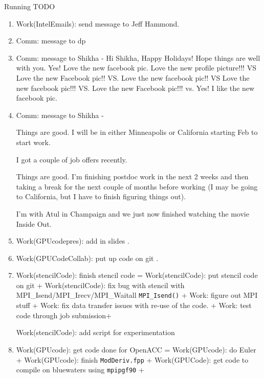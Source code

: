 \begin{frame}
\begin{columns}
\begin{column}{0.50\linewidth}
\begin{block}{Running TODO}
\begin{enumerate}
         
  
     \item \tiny Work(IntelEmails): send message to Jeff Hammond. 

     
   \item \tiny Comm: message to dp 
   \item \tiny Comm: message to Shikha  - Hi Shikha,
     Happy Holidays! Hope things are well with you. 
     Yes! Love the new facebook pic. 
     Love the new profile picture!!! VS  Love the new Facebook pic!!
     VS.  Love the new facebook pic!! VS  Love the new facebook pic!!!
     VS. Love the new Facebook pic!!! vs. Yes! I like the new facebook
     pic. 

   \item \tiny Comm: message to Shikha  - 

     Things are good. I will be in either Minneapolis or California 
     starting Feb to start work. 

I got a couple of job offers recently. 

     Things are good. I'm finishing postdoc work in the next 2 weeks
     and then taking a break for the next couple of months before
     working (I may be going to California, but I have to finish
     figuring things out).

     I'm with Atul in Champaign and we just now finished watching the
     movie Inside Out.

     \item \tiny Work(GPUcodepres): add in slides .  

   \item \tiny Work(GPUCodeCollab): put up code on git .  
 
     \item \tiny Work(stencilCode): finish stencil code =
       Work(stencilCode): put stencil code on git + Work(stencilCode):
       fix bug with stencil with MPI\_Isend/MPI\_Irecv/MPI\_Waitall
       {\tt MPI\_Isend()}  + Work: figure out MPI stuff + Work: fix
       data transfer issues with re-use of the code.  + Work: test
       code through job submission+ 

        Work(stencilCode): add script for experimentation 

     \item \tiny Work(GPUcode): get code done for OpenACC =
       Work(GPUcode): do Euler + Work(GPUcode): finish {\tt ModDeriv.fpp}
       + Work(GPUCode): get code to compile on bluewaters using
       {\tt mpipgf90} + 


\end{enumerate}
\end{block}
\end{column}
\end{columns}
\end{frame}
